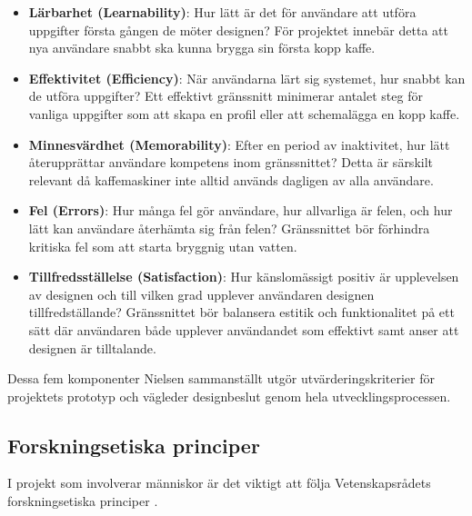 \begin{itemize}
    \item \textbf{Lärbarhet (Learnability)}: Hur lätt är det för användare att utföra uppgifter första gången de möter designen? För projektet innebär detta att nya användare snabbt ska kunna brygga sin första kopp kaffe.
    
    \item \textbf{Effektivitet (Efficiency)}: När användarna lärt sig systemet, hur snabbt kan de utföra uppgifter? Ett effektivt gränssnitt minimerar antalet steg för vanliga uppgifter som att skapa en profil eller att schemalägga en kopp kaffe.
    
    \item \textbf{Minnesvärdhet (Memorability)}: Efter en period av inaktivitet, hur lätt återupprättar användare kompetens inom gränssnittet? Detta är särskilt relevant då kaffemaskiner inte alltid används dagligen av alla användare.
    
    \item \textbf{Fel (Errors)}: Hur många fel gör användare, hur allvarliga är felen, och hur lätt kan användare återhämta sig från felen? Gränssnittet bör förhindra kritiska fel som att starta bryggnig utan vatten.
    
    \item \textbf{Tillfredsställelse (Satisfaction)}: Hur känslomässigt positiv är upplevelsen av designen och till vilken grad upplever användaren designen tillfredställande? Gränssnittet bör balansera estitik och funktionalitet på ett sätt där användaren både upplever användandet som effektivt samt anser att designen är tilltalande. 
\end{itemize}

Dessa fem komponenter Nielsen sammanställt utgör utvärderingskriterier för projektets prototyp och vägleder designbeslut genom hela utvecklingsprocessen.


\subsection{Forskningsetiska principer}

I projekt som involverar människor är det viktigt att följa Vetenskapsrådets forskningsetiska principer \cite{vetenskapsradet2002}. 


